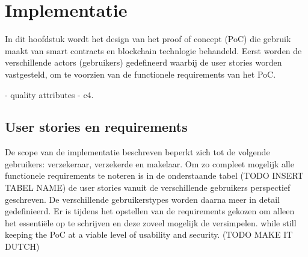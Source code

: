 \chapter{Implementatie}\label{chap:q2}
In dit hoofdstuk wordt het design van het proof of concept (PoC) die gebruik maakt van smart contracts en blockchain technlogie behandeld. Eerst worden de verschillende actors (gebruikers) gedefineerd waarbij de user stories worden vastgesteld, om te voorzien van de functionele requirements van het PoC.
\par

- quality attributes\newline
- c4.
\newpage

\section{User stories en requirements}
De scope van de implementatie beschreven beperkt zich tot de volgende gebruikers:
verzekeraar, verzekerde en makelaar. Om zo compleet mogelijk alle functionele requirements te noteren is in de onderstaande tabel (TODO INSERT TABEL NAME) de user stories vanuit de verschillende gebruikers perspectief geschreven. De verschillende gebruikerstypes worden daarna meer in detail gedefinieerd. Er is tijdens het opstellen van de requirements gekozen om alleen het essentiële op te schrijven en deze zoveel mogelijk de versimpelen. while still keeping the PoC at a viable level of usability and security. (TODO MAKE IT DUTCH)

